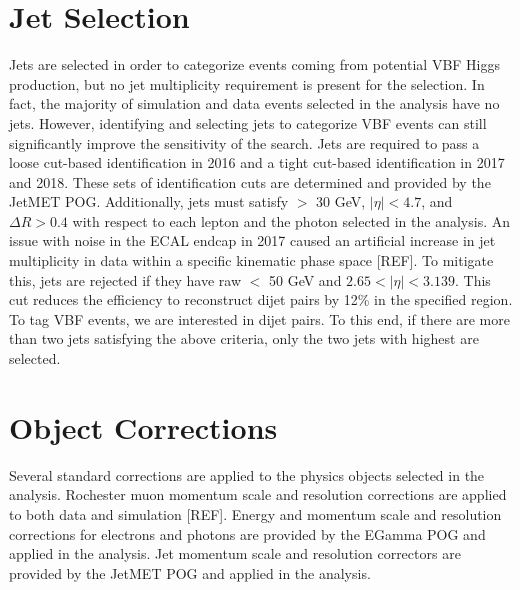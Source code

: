 \section{Jet Selection}
Jets are selected in order to categorize events coming from potential VBF Higgs production, but no jet multiplicity requirement is present 
for the \hzg selection. In fact, the majority of simulation and data events selected in the analysis have no jets. However, identifying 
and selecting jets to categorize VBF events can still significantly improve the sensitivity of the search. Jets are required to pass 
a loose cut-based identification in 2016 and a tight cut-based identification in 2017 and 2018. These sets of identification cuts are
determined and provided by the JetMET POG. Additionally, jets must satisfy \pt $>$ 30 GeV, $|\eta| < 4.7$, and $\Delta R > 0.4$ with 
respect to each lepton and the photon selected in the analysis. An issue with noise in the ECAL endcap in 2017 caused an artificial 
increase in jet multiplicity in data within a specific kinematic phase space [REF]. To mitigate this, jets are rejected if they have 
raw \pt $<$ 50 GeV and $2.65 < |\eta| < 3.139$. This cut reduces the efficiency to reconstruct dijet pairs by 12\% in the specified 
region. To tag VBF events, we are interested in dijet pairs. To this end, if there are more than two jets satisfying the above criteria, 
only the two jets with highest \pt are selected. 

\section{Object Corrections}
Several standard corrections are applied to the physics objects selected in the analysis. Rochester muon momentum scale and resolution 
corrections are applied to both data and simulation [REF]. Energy and momentum scale and resolution corrections for electrons 
and photons are provided by the EGamma POG and applied in the analysis. Jet momentum scale and resolution correctors are provided by 
the JetMET POG and applied in the analysis. 

